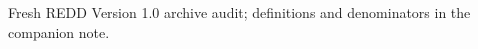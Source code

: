 \documentclass[border=7mm]{standalone}
\begin{document}
\begin{minipage}{6.6in}\centering

{\small Fresh REDD Version 1.0 archive audit; definitions and denominators in the companion note.}
\end{minipage}
\end{document}
